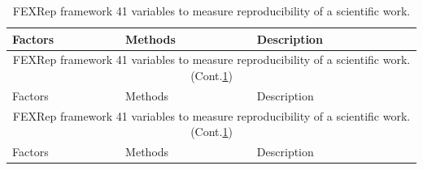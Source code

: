 \documentclass[
10pt, %
a4paper, %
oneside, %
headinclude,footinclude, %
BCOR5mm, %
]{scrartcl}
\begin{document}
\begin{longtable}[c]{|p{2cm}|p{4cm}|p{8cm}|}

\caption{FEXRep framework 41 variables to measure 
         reproducibility of a scientific work.\label{table:variables_41_FEXREP}}\\

 \hline
 Factors & Methods & Description\\
 \hline
 \endfirsthead

 \multicolumn{3}{c}{FEXRep framework 41 variables to
                    measure reproducibility of a 
                    scientific work. (Cont.\ref{table:variables_41_FEXREP})}\\
 \hline
 Factors & Methods & Description\\
 \hline
 \endhead

 \endhead

 \multicolumn{3}{c}{FEXRep framework 41 variables to
                    measure reproducibility of a 
                    scientific work. (Cont.\ref{table:variables_41_FEXREP})}\\
 \hline
 Factors & Methods & Description\\
 \hline
 \endhead
 

\end{longtable}
\end{document}
